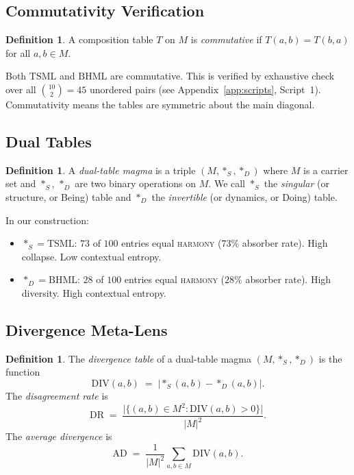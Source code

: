 \documentclass[11pt,a4paper]{article}
\theoremstyle{definition}
\newtheorem{definition}[theorem]{Definition}
\theoremstyle{remark}
\newcommand{\DR}{\mathrm{DR}}
\newcommand{\AD}{\mathrm{AD}}
\newcommand{\DIV}{\mathrm{DIV}}
\newcommand{\TSML}{\mathrm{TSML}}
\newcommand{\BHML}{\mathrm{BHML}}
\begin{document}
\subsection{Commutativity Verification}\label{sec:commutativity}

\begin{definition}\label{def:comm}
A composition table $T$ on $M$ is \emph{commutative} if $T(a,b) = T(b,a)$ for all $a,b\in M$.
\end{definition}

Both $\TSML$ and $\BHML$ are commutative. This is verified by exhaustive check over all $\binom{10}{2}=45$ unordered pairs (see Appendix~\ref{app:scripts}, Script~1). Commutativity means the tables are symmetric about the main diagonal.

\subsection{Dual Tables}\label{sec:dual}

\begin{definition}\label{def:dual}
A \emph{dual-table magma} is a triple $(M,\ast_{S},\ast_{D})$ where $M$ is a carrier set and $\ast_{S}$, $\ast_{D}$ are two binary operations on $M$. We call $\ast_{S}$ the \emph{singular} (or structure, or Being) table and $\ast_{D}$ the \emph{invertible} (or dynamics, or Doing) table.
\end{definition}

In our construction:
\begin{itemize}
\item $\ast_{S} = \TSML$: $73$ of $100$ entries equal \textsc{harmony} ($73\%$ absorber rate). High collapse. Low contextual entropy.
\item $\ast_{D} = \BHML$: $28$ of $100$ entries equal \textsc{harmony} ($28\%$ absorber rate). High diversity. High contextual entropy.
\end{itemize}

\subsection{Divergence Meta-Lens}\label{sec:divergence-def}

\begin{definition}\label{def:div}
The \emph{divergence table} of a dual-table magma $(M,\ast_{S},\ast_{D})$ is the function
\begin{equation}\label{eq:div}
\DIV(a,b) \;=\; |\ast_{S}(a,b) - \ast_{D}(a,b)|.
\end{equation}
The \emph{disagreement rate} is
\begin{equation}\label{eq:dr}
\DR \;=\; \frac{\bigl|\bigl\{(a,b)\in M^{2} : \DIV(a,b) > 0\bigr\}\bigr|}{|M|^{2}}.
\end{equation}
The \emph{average divergence} is
\begin{equation}\label{eq:ad}
\AD \;=\; \frac{1}{|M|^{2}}\sum_{a,b\in M}\DIV(a,b).
\end{equation}
\end{definition}
\end{document}
